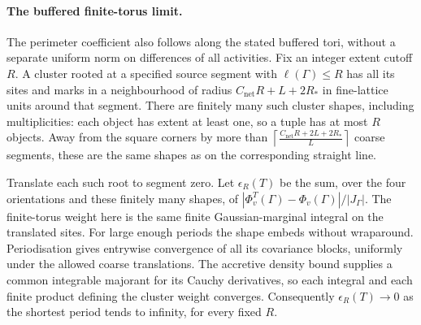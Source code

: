 \documentclass[11pt]{article}
\begin{document}
\paragraph{The buffered finite-torus limit.}
The perimeter coefficient also follows along the stated buffered tori, without a separate uniform norm on differences of all activities. Fix an integer extent cutoff $R$. A cluster rooted at a specified source segment with $\ell(\Gamma)\leq R$ has all its sites and marks in a neighbourhood of radius $C_{\mathrm{net}}R+L+2R_*$ in fine-lattice units around that segment. There are finitely many such cluster shapes, including multiplicities: each object has extent at least one, so a tuple has at most $R$ objects. Away from the square corners by more than $\left\lceil\frac{C_{\mathrm{net}}R+2L+2R_*}{L}\right\rceil$ coarse segments, these are the same shapes as on the corresponding straight line.

Translate each such root to segment zero. Let $\epsilon_R(T)$ be the sum, over the four orientations and these finitely many shapes, of $|\Phi^T_v(\Gamma)-\Phi_v(\Gamma)|/|J_\Gamma|$. The finite-torus weight here is the same finite Gaussian-marginal integral on the translated sites. For large enough periods the shape embeds without wraparound. Periodisation gives entrywise convergence of all its covariance blocks, uniformly under the allowed coarse translations. The accretive density bound supplies a common integrable majorant for its Cauchy derivatives, so each integral and each finite product defining the cluster weight converges. Consequently $\epsilon_R(T)\to0$ as the shortest period tends to infinity, for every fixed $R$.
\end{document}
